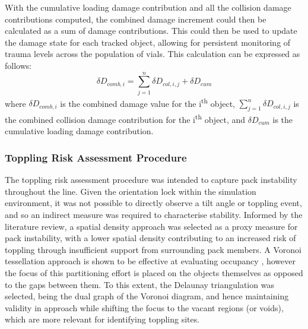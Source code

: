 \documentclass[10pt]{article}
\begin{document}
With the cumulative loading damage contribution and all the collision damage contributions computed, the combined damage increment could then be calculated as a sum of damage contributions. This could then be used to update the damage state for each tracked object, allowing for persistent monitoring of trauma levels across the population of vials. This calculation can be expressed as follows:
\begin{equation}
    \delta D_{comb, i} = \sum_{j=1}^{n}{\delta D_{col, i, j}} + \delta D_{cum}
    \label{eqn:damage_combine}
\end{equation}
where $\delta D_{comb, i}$ is the combined damage value for the i\textsuperscript{th} object, $\sum_{j=1}^{n}{\delta D_{col, i, j}}$ is the combined collision damage contribution for the i\textsuperscript{th} object, and $\delta D_{cum}$ is the cumulative loading damage contribution. 

\subsubsection{Toppling Risk Assessment Procedure}
The toppling risk assessment procedure was intended to capture pack instability throughout the line. Given the orientation lock within the simulation environment, it was not possible to directly observe a tilt angle or toppling event, and so an indirect measure was required to characterise stability. Informed by the literature review, a spatial density approach was selected as a proxy measure for pack instability, with a lower spatial density contributing to an increased risk of toppling through insufficient support from surrounding pack members. A Voronoi tessellation approach is shown to be effective at evaluating occupancy \cite{duyckaerts2000voronoi}, however the focus of this partitioning effort is placed on the objects themselves as opposed to the gaps between them. To this extent, the Delaunay triangulation was selected, being the dual graph of the Voronoi diagram, and hence maintaining validity in approach while shifting the focus to the vacant regions (or voids), which are more relevant for identifying toppling sites.
\end{document}
